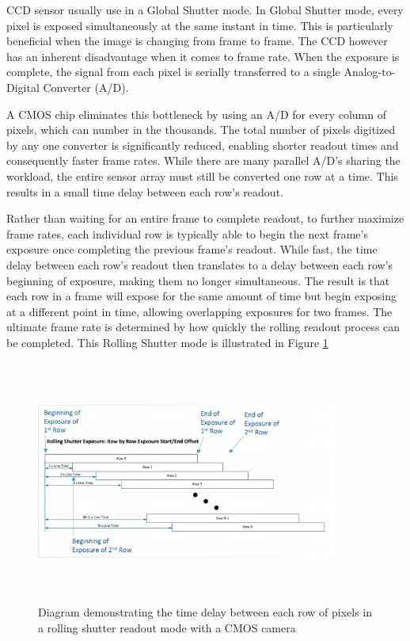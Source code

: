 CCD sensor usually use  in a Global Shutter mode. In Global Shutter mode, every pixel is exposed simultaneously at the same instant in time. This is particularly beneficial when the image is changing from frame to frame. The CCD however has an inherent disadvantage when it comes to frame rate. When the exposure is complete, the signal from each pixel is serially transferred to a single Analog-to-Digital Converter (A/D). 

A CMOS chip eliminates this bottleneck by using an A/D for every column of pixels, which can number in the thousands. The total number of pixels digitized by any one converter is significantly reduced, enabling shorter readout times and consequently faster frame rates. While there are many parallel A/D’s sharing the workload, the entire sensor array must still be converted one row at a time. This results in a small time delay between each row’s readout. 

Rather than waiting for an entire frame to complete readout, to further maximize frame rates, each individual row is typically able to begin the next frame’s exposure once completing the previous frame’s readout. While fast, the time delay between each row’s readout then translates to a delay between each row’s beginning of exposure, making them no longer simultaneous. The result is that each row in a frame will expose for the same amount of time but begin exposing at a different point in time, allowing overlapping exposures for two frames. The ultimate frame rate is determined by how quickly the rolling readout process can be completed. This Rolling Shutter mode is illustrated in Figure \ref{fig:Rolling} \cite{Shutter}

\begin{figure}[H]
\centering
\includegraphics[width=10cm,height=8cm,keepaspectratio]{imagenes/Rolling.png}
\caption{Diagram demonstrating
the time delay between each row
of pixels in a rolling shutter readout
mode with a CMOS camera}
\label{fig:Rolling}
\end{figure}

